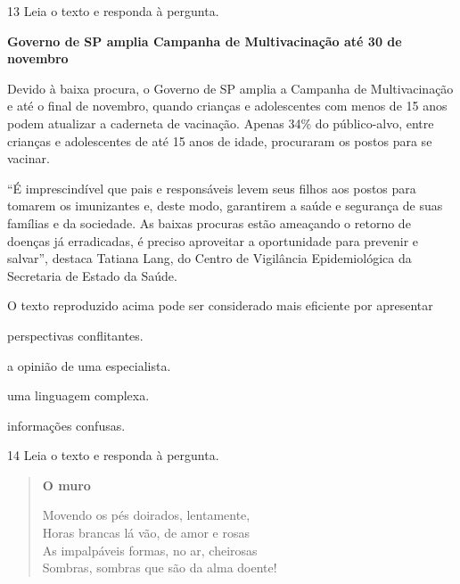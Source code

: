 \begin{myquote}
\begin{myescolha}
\num{13} Leia o texto e responda à pergunta.

\begin{myquote}
\textbf{Governo de SP amplia Campanha de Multivacinação até 30 de novembro}

Devido à baixa procura, o Governo de SP amplia a Campanha de
Multivacinação e até o final de novembro, quando crianças e adolescentes
com menos de 15 anos podem atualizar a caderneta de vacinação. Apenas
34\% do público-alvo, entre crianças e adolescentes de até 15 anos de
idade, procuraram os postos para se vacinar.

``É imprescindível que pais e responsáveis levem seus filhos aos postos
para tomarem os imunizantes e, deste modo, garantirem a saúde e
segurança de suas famílias e da sociedade. As baixas procuras estão
ameaçando o retorno de doenças já erradicadas, é preciso aproveitar a
oportunidade para prevenir e salvar'', destaca Tatiana Lang, do Centro de
Vigilância Epidemiológica da Secretaria de Estado da Saúde.

\end{myquote}

O texto reproduzido acima pode ser considerado mais eficiente por
apresentar

\begin{escolha}
  \item perspectivas conflitantes.

  \item a opinião de uma especialista.

  \item uma linguagem complexa.

  \item informações confusas.
\end{escolha}



\num{14} Leia o texto e responda à pergunta.

\begin{myquote}
\begin{verse}
\textbf{O muro}

Movendo os pés doirados, lentamente,\\
Horas brancas lá vão, de amor e rosas\\
As impalpáveis formas, no ar, cheirosas\\
Sombras, sombras que são da alma doente!
\end{verse}


\end{myquote}
\end{myescolha}
\end{myquote}
